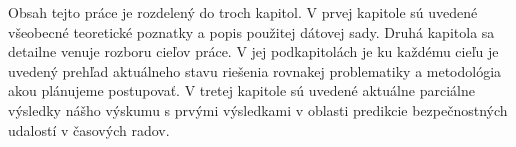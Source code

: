 \documentclass[thesismargins, thesislinespacing, openright, upjsfrontpage, combineabstracts]{rnthesis}
\begin{document}
Obsah tejto práce je rozdelený do troch kapitol. V prvej kapitole sú uvedené všeobecné teoretické poznatky a popis použitej dátovej sady. Druhá kapitola sa detailne venuje rozboru cieľov práce. V jej podkapitolách je ku každému cieľu je uvedený prehľad aktuálneho stavu riešenia rovnakej problematiky a metodológia akou plánujeme postupovať. V tretej kapitole sú uvedené aktuálne parciálne výsledky nášho výskumu s prvými výsledkami v oblasti predikcie bezpečnostných udalostí v časových radov.

 



\end{document}
